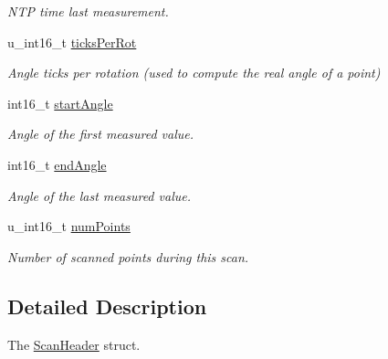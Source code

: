 \begin{DoxyCompactItemize}
\begin{DoxyCompactList}\small\item\em N\-T\-P time last measurement. \end{DoxyCompactList}\item 
\hypertarget{structpacpus_1_1ScanHeader_ae90050c5f517aab0ddec6a0a7a905e97}{u\-\_\-int16\-\_\-t \hyperlink{structpacpus_1_1ScanHeader_ae90050c5f517aab0ddec6a0a7a905e97}{ticks\-Per\-Rot}}\label{structpacpus_1_1ScanHeader_ae90050c5f517aab0ddec6a0a7a905e97}

\begin{DoxyCompactList}\small\item\em Angle ticks per rotation (used to compute the real angle of a point) \end{DoxyCompactList}\item 
\hypertarget{structpacpus_1_1ScanHeader_a805ffbef47d7e001ec4d22b8a56afd87}{int16\-\_\-t \hyperlink{structpacpus_1_1ScanHeader_a805ffbef47d7e001ec4d22b8a56afd87}{start\-Angle}}\label{structpacpus_1_1ScanHeader_a805ffbef47d7e001ec4d22b8a56afd87}

\begin{DoxyCompactList}\small\item\em Angle of the first measured value. \end{DoxyCompactList}\item 
\hypertarget{structpacpus_1_1ScanHeader_ab7342b6eb6939702c6a2d0f61cd212d8}{int16\-\_\-t \hyperlink{structpacpus_1_1ScanHeader_ab7342b6eb6939702c6a2d0f61cd212d8}{end\-Angle}}\label{structpacpus_1_1ScanHeader_ab7342b6eb6939702c6a2d0f61cd212d8}

\begin{DoxyCompactList}\small\item\em Angle of the last measured value. \end{DoxyCompactList}\item 
u\-\_\-int16\-\_\-t \hyperlink{structpacpus_1_1ScanHeader_a92f397bf893b9869c8847eb4a39a8005}{num\-Points}
\begin{DoxyCompactList}\small\item\em Number of scanned points during this scan. \end{DoxyCompactList}\end{DoxyCompactItemize}


\subsection{Detailed Description}
The \hyperlink{structpacpus_1_1ScanHeader}{Scan\-Header} struct. 

